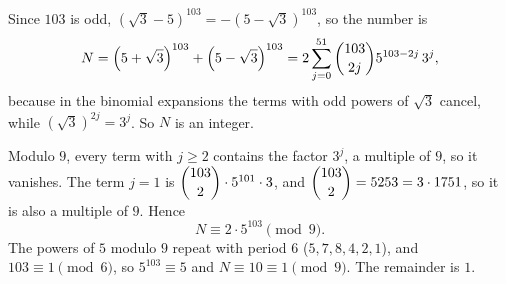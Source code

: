 Since $103$ is odd, $\left(\sqrt3-5\right)^{103}=-\left(5-\sqrt3\right)^{103}$, so the number is
\[N=\left(5+\sqrt3\right)^{103}+\left(5-\sqrt3\right)^{103}=2\sum_{j=0}^{51}\dbinom{103}{2j}5^{103-2j}\,3^{j},\]
because in the binomial expansions the terms with odd powers of $\sqrt3$ cancel, while $\left(\sqrt3\right)^{2j}=3^j$. So $N$ is an integer.

Modulo $9$, every term with $j\ge2$ contains the factor $3^j$, a multiple of $9$, so it vanishes. The term $j=1$ is $\dbinom{103}{2}\cdot5^{101}\cdot3$, and $\dbinom{103}{2}=5253=3\cdot1751$, so it is also a multiple of $9$. Hence
\[N\equiv2\cdot5^{103}\pmod9.\]
The powers of $5$ modulo $9$ repeat with period $6$ ($5,7,8,4,2,1$), and $103\equiv1\pmod6$, so $5^{103}\equiv5$ and $N\equiv10\equiv1\pmod9$. The remainder is $\boxed{1}$.
